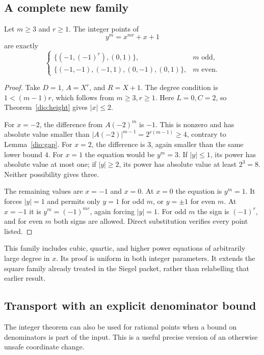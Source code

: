 \subsection{A complete new family}

\begin{theorem}
\label{dio:family}
Let $m\geq3$ and $r\geq1$.  The integer points of
\[
                         y^m=x^{mr}+x+1
\]
are exactly
\[
 \begin{cases}
 \{(-1,(-1)^r),(0,1)\},&m\text{ odd},\\
 \{(-1,-1),(-1,1),(0,-1),(0,1)\},&m\text{ even}.
 \end{cases}
\]
\end{theorem}
\begin{proof}
Take $D=1$, $A=X^r$, and $R=X+1$.  The degree condition is
$1<(m-1)r$, which follows from $m\geq3,r\geq1$.  Here $L=0,C=2$,
so Theorem~\ref{dio:height} gives $|x|\leq2$.

For $x=-2$, the difference from $A(-2)^m$ is $-1$.  This is nonzero
and has absolute value smaller than
$|A(-2)|^{m-1}=2^{r(m-1)}\geq4$, contrary to Lemma~\ref{dio:gap}.
For $x=2$, the difference is $3$, again smaller than the same lower
bound $4$.  For $x=1$ the equation would be $y^m=3$.
If $|y|\leq1$, its power has absolute value at most one; if $|y|\geq2$,
its power has absolute value at least $2^3=8$.  Neither possibility
gives three.

The remaining values are $x=-1$ and $x=0$.  At $x=0$ the equation is
$y^m=1$.  It forces $|y|=1$ and permits only $y=1$ for odd $m$, or
$y=\pm1$ for even $m$.  At $x=-1$ it is
$y^m=(-1)^{mr}$, again forcing $|y|=1$.  For odd $m$ the sign is
$(-1)^r$, and for even $m$ both signs are allowed.  Direct substitution
verifies every point listed.
\end{proof}

This family includes cubic, quartic, and higher power equations of
arbitrarily large degree in $x$.  Its proof is uniform in both integer
parameters.  It extends the square family already treated in the
Siegel packet, rather than relabelling that earlier result.

\subsection{Transport with an explicit denominator bound}

The integer theorem can also be used for rational points when a bound
on denominators is part of the input.  This is a useful precise version
of an otherwise unsafe coordinate change.

